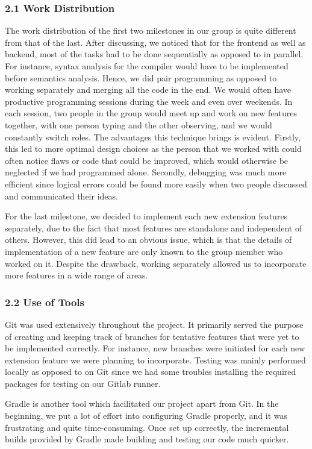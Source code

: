 \documentclass[10pt,a4paper]{report}
\begin{document}
  \subsubsection*{2.1 Work Distribution}
  The work distribution of the first two milestones in our group is quite
  different from that of the last. After discussing, we noticed that for the
  frontend as well as backend, most of the tasks had to be done sequentially as
  opposed to in parallel. For instance, syntax analysis for the compiler would
  have to be implemented before semantics analysis. Hence, we did pair
  programming as opposed to working separately and merging all the code in the
  end. We would often have productive programming sessions during the week and
  even over weekends. In each session, two people in the group would meet up and
  work on new features together, with one person typing and the other observing,
  and we would constantly switch roles. The advantages this technique brings is
  evident. Firstly, this led to more optimal design choices as the person that
  we worked with could often notice flaws or code that could be improved, which
  would otherwise be neglected if we had programmed alone. Secondly, debugging
  was much more efficient since logical errors could be found more easily when
  two people discussed and communicated their ideas.

  For the last milestone, we decided to implement each new extension features
  separately, due to the fact that most features are standalone and independent
  of others. However, this did lead to an obvious issue, which is that the
  details of implementation of a new feature are only known to the group member
  who worked on it. Despite the drawback, working separately allowed us to
  incorporate more features in a wide range of areas.

  \subsubsection*{2.2 Use of Tools}
  Git was used extensively throughout the project. It primarily served the
  purpose of creating and keeping track of branches for tentative features that
  were yet to be implemented correctly. For instance, new branches were
  initiated for each new extension feature we were planning to incorporate.
  Testing was mainly performed locally as opposed to on Git since we had some
  troubles installing the required packages for testing on our Gitlab runner.

  Gradle is another tool which facilitated our project apart from Git. In the
  beginning, we put a lot of effort into configuring Gradle properly, and it was
  frustrating and quite time-consuming. Once set up correctly, the incremental
  builds provided by Gradle made building and testing our code much quicker.
\end{document}
